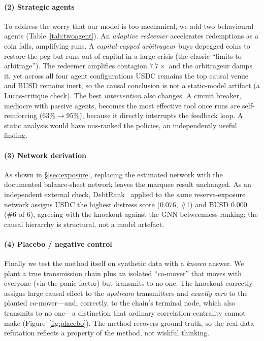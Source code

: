 \documentclass[sigconf,anonymous]{acmart}
\begin{document}
\paragraph{(2) Strategic agents} To address the worry that our model is too mechanical, we add two
behavioural agents (Table~\ref{tab:twoagent}). An \emph{adaptive redeemer} accelerates redemptions
as a coin falls, amplifying runs. A \emph{capital-capped arbitrageur} buys depegged coins to restore
the peg but runs out of capital in a large crisis (the classic ``limits to arbitrage''). The redeemer
amplifies contagion $7.7\times$ and the arbitrageur damps it, yet across all four agent configurations
USDC remains the top causal venue and BUSD remains inert, so the causal conclusion is not a
static-model artifact (a Lucas-critique check). The best \emph{intervention} also changes. A circuit breaker, mediocre with passive agents, becomes the most effective tool once runs are
self-reinforcing ($63\%\to95\%$), because it directly interrupts the feedback
loop. A static analysis would have mis-ranked the policies, an independently useful finding.

\paragraph{(3) Network derivation} As shown in \S\ref{sec:exposure}, replacing the estimated network
with the documented balance-sheet network leaves the marquee result unchanged.
As an independent external check, DebtRank~\cite{battiston2012debtrank} applied to the same
reserve-exposure network assigns USDC the highest distress score ($0.076$, \#1) and BUSD $0.000$
(\#6 of 6), agreeing with the knockout against the GNN betweenness ranking; the causal
hierarchy is structural, not a model artefact.

\paragraph{(4) Placebo / negative control} Finally we test the method itself on synthetic data with
a \emph{known} answer. We plant a true transmission chain plus an isolated ``co-mover'' that moves
with everyone (via the panic factor) but transmits to no one. The knockout correctly assigns large
causal effect to the \emph{upstream} transmitters and \emph{exactly zero} to the planted co-mover---and,
correctly, to the chain's terminal node, which also transmits to no one---a distinction
that ordinary correlation centrality cannot make (Figure~\ref{fig:placebo}). The method recovers
ground truth, so the real-data refutation reflects a property of the method, not wishful thinking.
\end{document}
